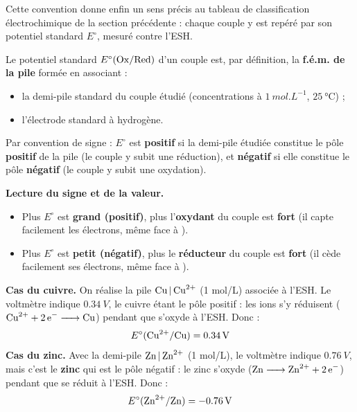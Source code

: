 \documentclass[11pt]{article}
\newcommand{\cle}[1]{{\popxbold\color{popdark}#1}}
\begin{document}
Cette convention donne enfin un sens précis au tableau de classification électrochimique de la section précédente : chaque couple y est repéré par son \cle{potentiel standard} $E^\circ$, mesuré contre l'ESH.

\begin{definition}
Le \cle{potentiel standard} $E^\circ(\ce{Ox}/\ce{Red})$ d'un couple est, par définition, la \textbf{f.é.m. de la pile} formée en associant :
\begin{itemize}
\item la demi-pile standard du couple étudié (concentrations à $\SI{1}{mol.L^{-1}}$, $\SI{25}{\celsius}$) ;
\item l'électrode standard à hydrogène.
\end{itemize}
Par convention de signe : $E^\circ$ est \textbf{positif} si la demi-pile étudiée constitue le pôle \textbf{positif} de la pile (le couple y subit une réduction), et \textbf{négatif} si elle constitue le pôle \textbf{négatif} (le couple y subit une oxydation).
\end{definition}

\textbf{Lecture du signe et de la valeur.}\par
\begin{itemize}
\item Plus $E^\circ$ est \textbf{grand (positif)}, plus l'\textbf{oxydant} du couple est \textbf{fort} (il capte facilement les électrons, même face à ).
\item Plus $E^\circ$ est \textbf{petit (négatif)}, plus le \textbf{réducteur} du couple est \textbf{fort} (il cède facilement ses électrons, même face à ).
\end{itemize}

\begin{exemplebox}
\textbf{Cas du cuivre.} On réalise la pile $\ce{Cu | Cu^2+}$ (1 mol/L) associée à l'ESH. Le voltmètre indique $\SI{0,34}{V}$, le cuivre étant le pôle positif : les ions  s'y réduisent ($\ce{Cu^2+ + 2e- -> Cu}$) pendant que  s'oxyde à l'ESH. Donc :
\[ E^\circ(\ce{Cu^2+}/\ce{Cu}) = \SI{+0,34}{V} \]
\textbf{Cas du zinc.} Avec la demi-pile $\ce{Zn | Zn^2+}$ (1 mol/L), le voltmètre indique $\SI{0,76}{V}$, mais c'est le \textbf{zinc} qui est le pôle négatif : le zinc s'oxyde ($\ce{Zn -> Zn^2+ + 2e-}$) pendant que  se réduit à l'ESH. Donc :
\[ E^\circ(\ce{Zn^2+}/\ce{Zn}) = \SI{-0,76}{V} \]
\end{exemplebox}
\end{document}
